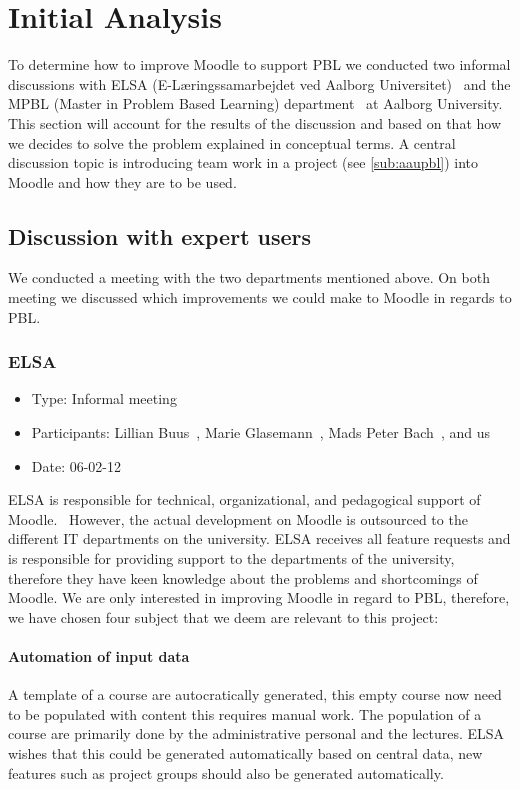 \section{Initial Analysis}
\label{sec:initialAnalysis}
To determine how to improve Moodle to support PBL we conducted two informal discussions with  ELSA (E-Læringssamarbejdet ved Aalborg Universitet)~\cite{elsa} and the MPBL (Master in Problem Based Learning) department~\cite{mpbl} at Aalborg University.
This section will account for the results of the discussion and based on that how we decides to solve the problem explained in conceptual terms.
A central discussion topic is introducing team work in a project (see \ref{sub:aaupbl}) into Moodle and how they are to be used.     

\subsection{Discussion with expert users}  
\label{sub:expertUsers} 
We conducted a meeting with the two departments mentioned above. On both meeting we discussed which improvements we could make to Moodle in regards to PBL.  

\subsubsection{ELSA}
\begin{itemize}
	\item Type: Informal meeting
	\item Participants: Lillian Buus~\cite{lillian}, Marie Glasemann~\cite{marie}, Mads Peter Bach~\cite{mads}, and us 
	\item Date: 06-02-12
\end{itemize}
ELSA is responsible for technical, organizational, and pedagogical support of Moodle.~\cite{elsa} 
However, the actual development on Moodle is outsourced to the different IT departments on the university. 
ELSA receives all feature requests and is responsible for providing support to the departments of the university, therefore they have keen knowledge about the problems and shortcomings of Moodle. 
We are only interested in improving Moodle in regard to PBL, therefore, we have chosen four subject that we deem are relevant to this project:

\paragraph{Automation of input data} A template of a course are autocratically generated, this empty course now need to be populated with content this requires manual work. 
The population of a course are primarily done by the administrative personal and the lectures. 
ELSA wishes that this could be generated automatically based on central data, new features such as project groups should also be generated automatically.     
